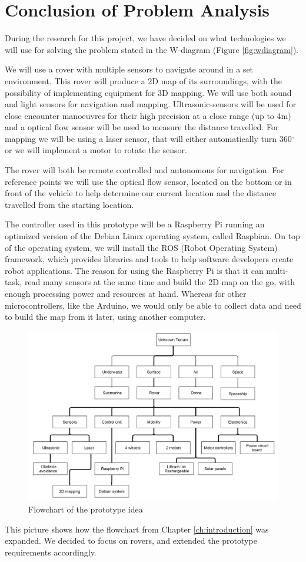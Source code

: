 \section{Conclusion of Problem Analysis}

During the research for this project, we have decided on what technologies we will use for solving the problem stated in the W-diagram (Figure \ref{fig:wdiagram}).

We will use a rover with multiple sensors to navigate around in a set environment. This rover will produce a 2D map of its surroundings, with the possibility of implementing equipment for 3D mapping. We will use both sound and light sensors for navigation and mapping. Ultrasonic-sensors will be used for close encounter manoeuvres for their high precision at a close range (up to 4m)\cite{hcsr40datesheet} and a optical flow sensor will be used to measure the distance travelled. For mapping we will be using a laser sensor, that will either automatically turn 360$^{\circ}$ or we will implement a motor to rotate the sensor.

The rover will both be remote controlled and autonomous for navigation. For reference points we will use the optical flow sensor, located on the bottom or in front of the vehicle to help determine our current location and the distance travelled from the starting location.

The controller used in this prototype will be a Raspberry Pi running an optimized version of the Debian Linux operating system, called Raspbian. On top of the operating system, we will install the ROS (Robot Operating System) framework, which provides libraries and tools to help software developers create robot applications\cite{ros}.
The reason for using the Raspberry Pi is that it can multi-task, read many sensors at the same time and build the 2D map on the go, with enough processing power and resources at hand. Whereas for other microcontrollers, like the Arduino, we would only be able to collect data and need to build the map from it later, using another computer.

\begin{figure}[H]
	\centering
	\includegraphics[scale=.1]{images/level3.png}
	\caption{Flowchart of the prototype idea}
	\label{fig:level3}
\end{figure}

This picture shows how the flowchart from Chapter \ref{ch:introduction} was expanded. We decided to focus on rovers, and extended the prototype requirements accordingly.

\clearpage
